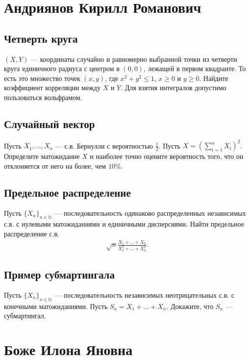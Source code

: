 \documentclass[12pt]{article}
\newcommand\N{\mathbb{N}}
\begin{document}
\newpage
\section{Андриянов Кирилл Романович}

\subsection{Четверть круга}

$(X, Y)$ --- координаты случайно и равномерно выбранной точки из четверти круга единичного радиуса с центром в $(0, 0)$, лежащей в первом квадранте. То есть это множество точек $(x, y)$, где $x^2 + y^2 \le 1$, $x \ge 0$ и $y \ge 0$. Найдите коэффициент корреляции между $X$ и $Y$. Для взятия интегралов  допустимо пользоваться вольфрамом.


\subsection{Случайный вектор}

Пусть $X_1, \dots, X_n$ --- с.в. Бернулли с вероятностью $\frac{1}{2}$. Пусть $X = (\sum_{i = 1}^n X_i)^2$. Определите матожидание $X$ и наиболее точно оцените вероятность того, что он отклоняется от него на более, чем $10\%$.


\subsection{Предельное распределение}

Пусть $\{X_n\}_{n \in \N}$ --- последовательность одинаково распределенных независимых с.в. с нулевыми матожиданиями и единичными дисперсиями. Найти предельное распределение с.в.
\begin{align*}
    \sqrt{n}\frac{X_1 + \dots + X_n}{X_1^2 + \dots + X_n^2}.
\end{align*}

\subsection{Пример субмартингала}

Пусть $\{X_n\}_{n \in \N}$ --- последовательность независимых неотрицательных с.в. с конечными матожиданиями. Пусть $S_n = X_1 + \dots + X_n$. Докажите, что $S_n$ --- субмартингал.

\newpage
\section{Боже Илона Яновна}
\end{document}
